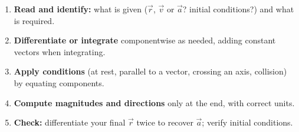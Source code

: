 \documentclass[11pt]{article}
\begin{document}
\begin{methode}
\begin{enumerate}
\item \textbf{Read and identify:} what is given ($\vec{r}$, $\vec{v}$ or $\vec{a}$? initial conditions?) and what is required.
\item \textbf{Differentiate or integrate} componentwise as needed, adding constant vectors when integrating.
\item \textbf{Apply conditions} (at rest, parallel to a vector, crossing an axis, collision) by equating components.
\item \textbf{Compute magnitudes and directions} only at the end, with correct units.
\item \textbf{Check:} differentiate your final $\vec{r}$ twice to recover $\vec{a}$; verify initial conditions.
\end{enumerate}
\end{methode}
\end{document}
